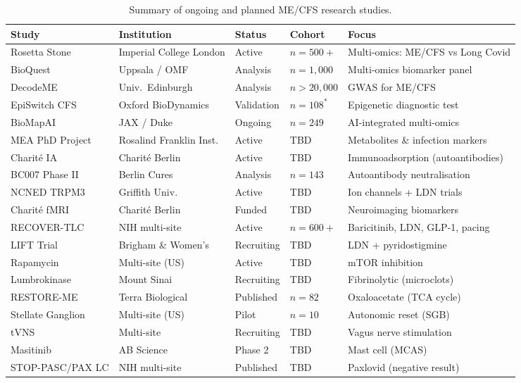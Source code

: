 \begin{table}[htbp]
\centering
\small
\caption{Summary of ongoing and planned ME/CFS research studies.}
\label{tab:registry-summary}
\begin{tabular}{@{}p{3.0cm}p{2.6cm}p{1.6cm}p{1.3cm}p{4.8cm}@{}}
\toprule
\textbf{Study} & \textbf{Institution} & \textbf{Status} & \textbf{Cohort} & \textbf{Focus} \\
\midrule
Rosetta Stone & Imperial College London & Active & $n=500+$ & Multi-omics: ME/CFS vs Long Covid \\
BioQuest & Uppsala / OMF & Analysis & $n=1{,}000$ & Multi-omics biomarker panel \\
DecodeME & Univ.\ Edinburgh & Analysis & $n>20{,}000$ & GWAS for ME/CFS \\
EpiSwitch CFS & Oxford BioDynamics & Validation & $n=108^*$ & Epigenetic diagnostic test \\
BioMapAI & JAX / Duke & Ongoing & $n=249$ & AI-integrated multi-omics \\
MEA PhD Project & Rosalind Franklin Inst. & Active & TBD & Metabolites \& infection markers \\
Charit\'{e} IA & Charit\'{e} Berlin & Active & TBD & Immunoadsorption (autoantibodies) \\
BC007 Phase II & Berlin Cures & Analysis & $n=143$ & Autoantibody neutralisation \\
NCNED TRPM3 & Griffith Univ. & Active & TBD & Ion channels + LDN trials \\
Charit\'{e} fMRI & Charit\'{e} Berlin & Funded & TBD & Neuroimaging biomarkers \\
RECOVER-TLC & NIH multi-site & Active & $n=600+$ & Baricitinib, LDN, GLP-1, pacing \\
LIFT Trial & Brigham \& Women's & Recruiting & TBD & LDN + pyridostigmine \\
Rapamycin & Multi-site (US) & Active & TBD & mTOR inhibition \\
Lumbrokinase & Mount Sinai & Recruiting & TBD & Fibrinolytic (microclots) \\
RESTORE-ME & Terra Biological & Published & $n=82$ & Oxaloacetate (TCA cycle) \\
Stellate Ganglion & Multi-site (US) & Pilot & $n=10$ & Autonomic reset (SGB) \\
tVNS & Multi-site & Recruiting & TBD & Vagus nerve stimulation \\
Masitinib & AB Science & Phase 2 & TBD & Mast cell (MCAS) \\
STOP-PASC/PAX LC & NIH multi-site & Published & TBD & Paxlovid (negative result) \\

\end{tabular}
\end{table}
